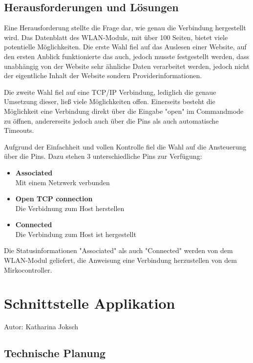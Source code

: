   \subsection{Herausforderungen und Lösungen}
  Eine Herausforderung stellte die Frage dar, wie genau die Verbindung hergestellt wird. Das Datenblatt des WLAN-Moduls, mit über 100 Seiten, bietet viele potentielle Möglichkeiten.
  Die erste Wahl fiel auf das Auslesen einer Website, auf den ersten Anblick funktionierte das auch, jedoch musste festgestellt werden, dass unabhängig von der Website sehr ähnliche
  Daten verarbeitet werden, jedoch nicht der eigentliche Inhalt der Website sondern Providerinformationen.

  Die zweite Wahl fiel auf eine TCP/IP Verbindung, lediglich die genaue Umsetzung dieser, ließ viele Möglichkeiten offen. Einerseits besteht die Möglichkeit eine Verbindung direkt
  über die Eingabe "open" im Commandmode zu öffnen, andererseits jedoch auch über die Pins als auch automatische Timeouts.

  Aufgrund der Einfachheit und vollen Kontrolle fiel die Wahl auf die Ansteuerung über die Pins.
  Dazu stehen 3 unterschiedliche Pins zur Verfügung:
  \begin{itemize}
    \item \textbf{Associated}\\
    Mit einem Netzwerk verbunden
    \item \textbf{Open TCP connection}\\
    Die Verbidnung zum Host herstellen
    \item \textbf{Connected}\\
    Die Verbindung zum Host ist hergestellt
  \end{itemize}
  Die Statusinformationen "Associated" als auch "Connected" werden von dem WLAN-Modul geliefert, die Anweisung eine Verbindung herzustellen von dem Mirkocontroller.

\pagebreak
\section{Schnittstelle Applikation}
Autor: Katharina Joksch\\

  \subsection{Technische Planung}

